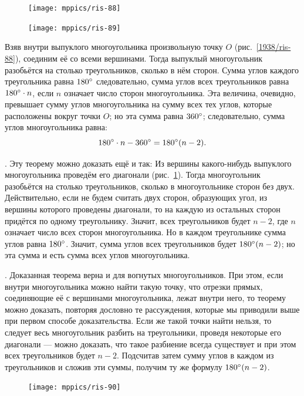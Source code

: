 \documentclass[oneside]{book}
\begin{document}
\begin{figure}
\centering
\texttt{[image: mppics/ris-88]}
\caption{}\label{1938/ris-88}
\bigskip
\texttt{[image: mppics/ris-89]}
\caption{}\label{1938/ris-89}
\end{figure}

Взяв внутри выпуклого многоугольника произвольную точку $O$ (рис.~\ref{1938/ris-88}), соединим её со всеми вершинами.
Тогда выпуклый многоугольник разобьётся на столько треугольников, сколько в нём сторон.
Сумма углов каждого треугольника равна $180\degree$ следовательно, сумма углов всех треугольников равна $180\degree\cdot n$, если $n$ означает число сторон многоугольника.
Эта величина, очевидно, превышает сумму углов многоугольника на сумму всех тех углов, которые расположены вокруг точки $O$;
но эта сумма равна $360\degree$;
следовательно, сумма углов многоугольника равна:
\[180\degree\cdot n -360\degree = 180\degree(n - 2).\]



\mbox{.}
Эту теорему можно доказать ещё и так:
Из вершины какого-нибудь выпуклого многоугольника проведём его диагонали (рис.~\ref{1938/ris-89}).
Тогда многоугольник разобьётся на столько треугольников, сколько в многоугольнике сторон без двух.
Действительно, если не будем считать двух сторон, образующих угол, из вершины которого проведены диагонали, то на каждую из остальных сторон придётся по одному треугольнику.
Значит, всех треугольников будет $n-2$, где $n$ означает число всех сторон многоугольника.
Но в каждом треугольнике сумма углов равна $180\degree$.
Значит, сумма углов всех треугольников будет $180\degree(n-2)$;
но эта сумма и есть сумма всех углов многоугольника.

\medskip

.
Доказанная теорема верна и для вогнутых многоугольников.
При этом, если внутри многоугольника можно найти такую точку, что отрезки прямых, соединяющие её с вершинами многоугольника, лежат внутри него, то теорему можно доказать, повторяя дословно те рассуждения, которые мы приводили выше при первом способе доказательства.
Если же такой точки найти нельзя, то следует весь многоугольник разбить на треугольники, проведя некоторые его диагонали --- можно доказать, что такое разбиение всегда существует и при этом всех треугольников будет $n-2$.
Подсчитав затем сумму углов в каждом из треугольников и сложив эти суммы, получим ту же формулу $180\degree(n - 2)$.

\begin{figure}
\centering
\texttt{[image: mppics/ris-90]}
\caption{}\label{1938/ris-90}
\end{figure}
\end{document}

